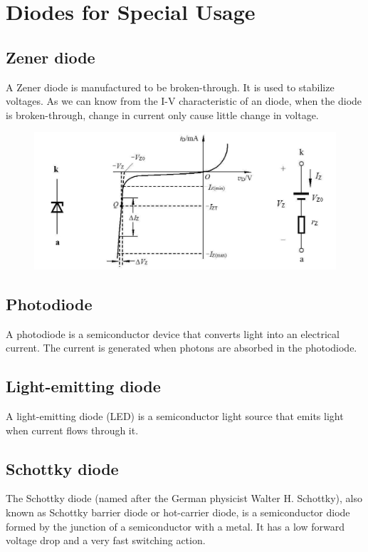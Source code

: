 \section{Diodes for Special Usage}

\subsection{Zener diode}

A Zener diode is manufactured to be broken-through. It is used to stabilize voltages. As we can know from the I-V characteristic of an diode, when the diode is broken-through, change in current only cause little change in voltage.

\begin{figure}[H]
  \centering
  \includegraphics[width=0.8\linewidth]{figures/Zener-diode-1}
\end{figure}

\subsection{Photodiode}

A photodiode is a semiconductor device that converts light into an electrical current. The current is generated when photons are absorbed in the photodiode.

\subsection{Light-emitting diode}

A light-emitting diode (LED) is a semiconductor light source that emits light when current flows through it.

\subsection{Schottky diode}

The Schottky diode (named after the German physicist Walter H. Schottky), also known as Schottky barrier diode or hot-carrier diode, is a semiconductor diode formed by the junction of a semiconductor with a metal. It has a low forward voltage drop and a very fast switching action.


